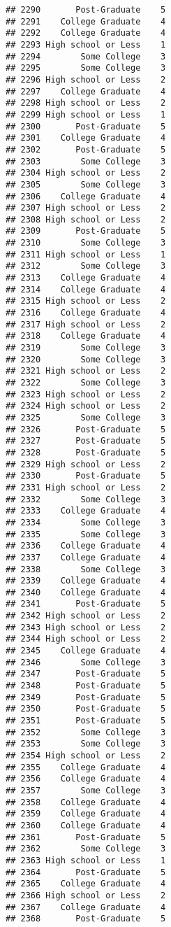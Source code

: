 \documentclass[
]{article}
\begin{document}
\begin{verbatim}
## 2290       Post-Graduate    5
## 2291    College Graduate    4
## 2292    College Graduate    4
## 2293 High school or Less    1
## 2294        Some College    3
## 2295        Some College    3
## 2296 High school or Less    2
## 2297    College Graduate    4
## 2298 High school or Less    2
## 2299 High school or Less    1
## 2300       Post-Graduate    5
## 2301    College Graduate    4
## 2302       Post-Graduate    5
## 2303        Some College    3
## 2304 High school or Less    2
## 2305        Some College    3
## 2306    College Graduate    4
## 2307 High school or Less    2
## 2308 High school or Less    2
## 2309       Post-Graduate    5
## 2310        Some College    3
## 2311 High school or Less    1
## 2312        Some College    3
## 2313    College Graduate    4
## 2314    College Graduate    4
## 2315 High school or Less    2
## 2316    College Graduate    4
## 2317 High school or Less    2
## 2318    College Graduate    4
## 2319        Some College    3
## 2320        Some College    3
## 2321 High school or Less    2
## 2322        Some College    3
## 2323 High school or Less    2
## 2324 High school or Less    2
## 2325        Some College    3
## 2326       Post-Graduate    5
## 2327       Post-Graduate    5
## 2328       Post-Graduate    5
## 2329 High school or Less    2
## 2330       Post-Graduate    5
## 2331 High school or Less    2
## 2332        Some College    3
## 2333    College Graduate    4
## 2334        Some College    3
## 2335        Some College    3
## 2336    College Graduate    4
## 2337    College Graduate    4
## 2338        Some College    3
## 2339    College Graduate    4
## 2340    College Graduate    4
## 2341       Post-Graduate    5
## 2342 High school or Less    2
## 2343 High school or Less    2
## 2344 High school or Less    2
## 2345    College Graduate    4
## 2346        Some College    3
## 2347       Post-Graduate    5
## 2348       Post-Graduate    5
## 2349       Post-Graduate    5
## 2350       Post-Graduate    5
## 2351       Post-Graduate    5
## 2352        Some College    3
## 2353        Some College    3
## 2354 High school or Less    2
## 2355    College Graduate    4
## 2356    College Graduate    4
## 2357        Some College    3
## 2358    College Graduate    4
## 2359    College Graduate    4
## 2360    College Graduate    4
## 2361       Post-Graduate    5
## 2362        Some College    3
## 2363 High school or Less    1
## 2364       Post-Graduate    5
## 2365    College Graduate    4
## 2366 High school or Less    2
## 2367    College Graduate    4
## 2368       Post-Graduate    5

\end{verbatim}
\end{document}
